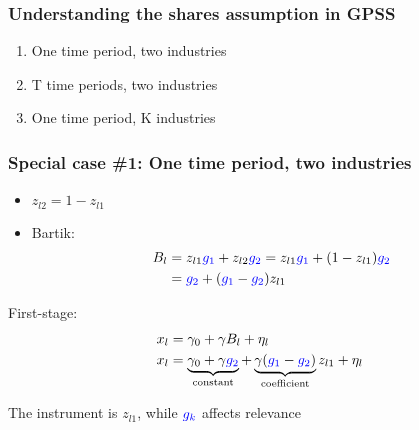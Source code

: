 \documentclass[notes,11pt, aspectratio=169]{beamer}
\begin{document}


\begin{frame}
  \frametitle{Understanding the shares assumption in GPSS}
  
  \begin{enumerate}
    \setlength\itemsep{1em}
  \item One time period, two industries
  \item T time periods, two industries
  \item One time period, K industries
  \end{enumerate}
  
  \end{frame}
  
  
  
  \begin{frame}[label=twoindustries]
  \frametitle{Special case \#1: One time period, two industries}
  \begin{itemize}
    \setlength\itemsep{1em}
  \item $z_{l2}= 1-z_{l1}$ 
  \item Bartik:  \begin{align*}B_l &= z_{l1} \textcolor{blue}{g_1} + z_{l2} \textcolor{blue}{g_2}  =z_{l1} \textcolor{blue}{g_1} + (1-z_{l1}) \textcolor{blue}{g_2} \notag \\
  &=\textcolor{blue}{g_2}+ (\textcolor{blue}{g_1} - \textcolor{blue}{g_2}) z_{l1} \notag
  \end{align*}
  \end{itemize} 
  First-stage:
  \begin{align*}
  x_l &= \gamma_0 + \gamma B_l + \eta_l \notag \\
  x_l &= \underbrace{\gamma_0+\gamma \textcolor{blue}{g_2}}_{\text{constant}} + \underbrace{\gamma (\textcolor{blue}{g_1} - \textcolor{blue}{g_2})}_{\text{coefficient}} z_{l1} + \eta_l \notag 
  \end{align*}
  
  The instrument is $z_{l1}$, while $\textcolor{blue}{g_k}$ affects relevance
  
  \hyperlink{whyolsisbiased}{}
  
  
  
  
  \end{frame}
  
  
  
  
  
\end{document}
